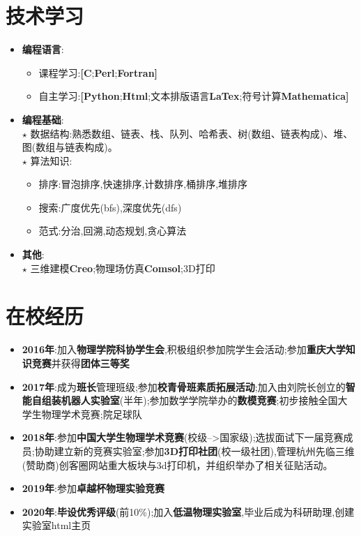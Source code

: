 \documentclass{resume}
\begin{document}
\section{技术学习}
\begin{itemize}
  \item \textbf{编程语言}:
  \begin{itemize}
    \item 课程学习:\textbf{[}\textbf{C};\textbf{Perl};\textbf{Fortran}\textbf{]}
    \item 自主学习:\textbf{[}\textbf{Python};\textbf{Html};文本排版语言\textbf{LaTex};符号计算\textbf{Mathematica}\textbf{]}

  \end{itemize}
  

  \item \textbf{编程基础}:
  \\ $\star$ 数据结构:熟悉数组、链表、栈、队列、哈希表、树(数组、链表构成)、堆、图(数组与链表构成)。
  \\ $\star$ 算法知识:
    \begin{itemize}
      \item 排序:冒泡排序,快速排序,计数排序,桶排序,堆排序
      \item 搜索:广度优先(bfs),深度优先(dfs)
      \item 范式:分治,回溯,动态规划,贪心算法
    \end{itemize}
  
  \item \textbf{其他}: 
  \\ $\star$ 三维建模\textbf{Creo};物理场仿真\textbf{Comsol};3D打印
\end{itemize}


\section{在校经历}
\begin{itemize}
  \item \textbf{2016年}:加入\textbf{物理学院科协学生会},积极组织参加院学生会活动;参加\textbf{重庆大学知识竞赛}并获得\textbf{团体三等奖}
  \item \textbf{2017年}:成为\textbf{班长}管理班级;参加\textbf{校青骨班素质拓展活动};加入由刘院长创立的\textbf{智能自组装机器人实验室}(半年);参加数学学院举办的\textbf{数模竞赛};初步接触全国大学生物理学术竞赛;院足球队
  \item \textbf{2018年}:参加\textbf{中国大学生物理学术竞赛}(校级-->国家级);选拔面试下一届竞赛成员;协助建立新的竞赛实验室;参加\textbf{3D打印社团}(校一级社团),管理杭州先临三维(赞助商)创客圈网站重大板块与3d打印机，并组织举办了相关征贴活动。
  \item \textbf{2019年}:参加\textbf{卓越杯物理实验竞赛}
  \item \textbf{2020年}:\textbf{毕设优秀评级}(前10\%);加入\textbf{低温物理实验室},毕业后成为科研助理,创建实验室html主页
\end{itemize}
\end{document}
